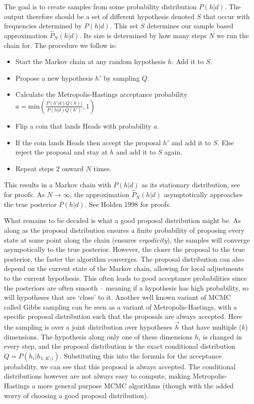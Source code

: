 The goal is to create samples from some probability distribution $P(h | d)$. The output therefore should be a set of different hypothesis denoted $S$ that occur with frequencies determined by $P(h | d)$. This set $S$ determines our sample based approximation $\hat{P}_N(h|d) $. Its size is determined by how many steps $N$ we run the chain for. The procedure we follow is:
\begin{itemize}
\item Start the Markov chain at any random hypothesis $h$. Add it to $S$.
\item Propose a new hypothesis $h'$ by sampling $Q$.
\item Calculate the Metropolis-Hastings acceptance probability $a = \text{min}\left( \frac{P(h' | d) Q(h))}{P(h | d) Q(h')}, 1 \right)$
\item Flip a coin that lands Heads with probability $a$.
\item If the coin lands Heads then accept the proposal $h'$ and add it to $S$. Else reject the proposal and stay at $h$ and add it to $S$ again.
\item Repeat steps 2 onward $N$ times.
\end{itemize}

This results in a Markov chain with $P(h|d)$ as its stationary distribution, see \citet{blitzstein2014introduction} for proofs. As  $N \rightarrow \infty$, the approximation $\hat{P}_N(h|d) $ asymptotically approaches the true posterior $P(h | d)$. See Holden 1998 \cite{holden1998geometric} for proofs.

What remains to be decided is what a good proposal distribution might be. As along as the proposal distribution ensures a finite probability of proposing every state at some point along the chain (ensures \textit{ergodicity}), the samples will converge asympotically to the true posterior. However, the closer the proposal to the true posterior, the faster the algorithm converges\cite{holden1998geometric}. The proposal distribution can also depend on the current state of the Markov chain, allowing for local adjustments to the current hypothesis. This often leads to good acceptance probabilities since the posteriors are often smooth -- meaning if a hypothesis has high probability, so will hypotheses that are `close' to it. Another well known variant of MCMC called Gibbs sampling can be seen as a variant of Metropolis-Hastings, with a specific proposal distribution such that the proposals are always accepted. Here the sampling is over a joint distribution over hypotheses $\vec{h}$ that have multiple ($k$) dimensions. The hypothesis along only one of these dimensions $h_i$ is changed in every step, and the proposal distribution is the exact conditional distribution $Q = P(h_i | h_{1:K\setminus i})$. Substituting this into the formula for the acceptance probability, we can see that this proposal is always accepted. The conditional distributions however are not always easy to compute, making Metropolis-Hastings a more general purpose MCMC algorithms (though with the added worry of choosing a good proposal distribution).

